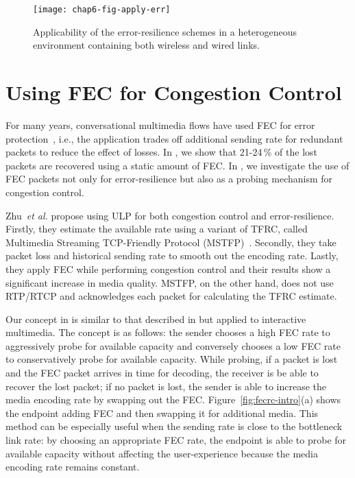 \begin{figure}
\centerline {
\texttt{[image: chap6-fig-apply-err]}
}
\caption{Applicability of the error-resilience schemes in a heterogeneous
environment containing both wireless and wired links.}
\label{fig:apply_err}
\end{figure}


\section{Using FEC for Congestion Control}

For many years, conversational multimedia flows have used FEC for error 
protection~\cite{855913, 664283}, i.e., the
application trades off additional sending rate for redundant packets to reduce
the effect of losses. In , we show that 21-24\,\% of the lost
packets are recovered using a static amount of FEC. In , we
investigate the use of FEC packets not only for error-resilience but also as a
probing mechanism for congestion control.

Zhu~\textit{et al.}\cite{Zhu:2001tu,springerlink:1022865704606} propose using
ULP for both congestion control and error-resilience. 
Firstly, they estimate the available rate using a variant of TFRC,
called Multimedia Streaming TCP-Friendly Protocol (MSTFP)~\cite{871542}.
Secondly, they take packet loss and historical sending rate to smooth out the
encoding rate. Lastly, they apply FEC while performing congestion control and
their results show a significant increase in media quality. MSTFP, on the other
hand, does not use RTP/RTCP and acknowledges each packet for calculating the
TFRC estimate.

Our concept in  is similar to that described in
\cite{Zhu:2001tu} but applied to interactive multimedia. The concept is as
follows: the sender chooses a high FEC rate to aggressively probe for
available capacity and conversely chooses a low FEC rate to conservatively
probe for available capacity. While probing, if a packet is lost and the FEC
packet arrives in time for decoding, the receiver is be able to recover the
lost packet; if no packet is lost, the sender is able to increase the media
encoding rate by swapping out the FEC. Figure~\ref{fig:fecrc-intro}(a) shows
the endpoint adding FEC and then swapping it for additional media. This method
can be especially useful when the sending rate is close to the bottleneck link
rate: by choosing an appropriate FEC rate, the endpoint is able to probe for
available capacity without affecting the user-experience because the media
encoding rate remains constant.


